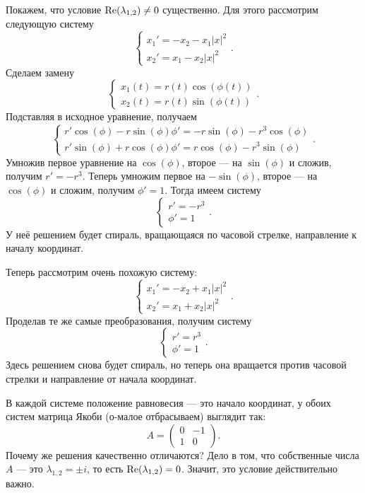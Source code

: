 Покажем, что условие $\operatorname{Re}(\lambda_{1, 2}) \ne 0$ существенно. Для этого рассмотрим следующую систему
\[
    \begin{cases}
        x_1' = -x_2 - x_1|x|^2 \\
        x_2' = x_1 - x_2|x|^2
    \end{cases}.
\]
Сделаем замену
\[
    \begin{cases}
        x_1(t) = r(t) \cos(\phi(t)) \\
        x_2(t) = r(t) \sin(\phi(t))
    \end{cases}.
\]
Подставляя в исходное уравнение, получаем
\[
    \begin{cases}
        r' \cos(\phi) - r \sin(\phi) \phi' = -r \sin(\phi) - r^3 \cos(\phi) \\
        r' \sin(\phi) + r \cos(\phi) \phi' = r \cos(\phi) - r^3 \sin(\phi)
    \end{cases}.
\]
Умножив первое уравнение на $\cos(\phi)$, второе --- на $\sin(\phi)$ и сложив, получим $r' = -r^3$.
Теперь умножим первое на $-\sin(\phi)$, второе --- на $\cos(\phi)$ и сложим, получим $\phi' = 1$.
Тогда имеем систему
\[
    \begin{cases}
        r' = -r^3\\
        \phi' = 1
    \end{cases}.
\]
У неё решением будет спираль, вращающаяся по часовой стрелке, направление к началу координат.

Теперь рассмотрим очень похожую систему:
\[
    \begin{cases}
        x_1' = -x_2 + x_1|x|^2 \\
        x_2' = x_1 + x_2|x|^2
    \end{cases}.
\]
Проделав те же самые преобразования, получим систему
\[
    \begin{cases}
        r' = r^3\\
        \phi' = 1
    \end{cases}.
\]
Здесь решением снова будет спираль, но теперь она вращается против часовой стрелки и направление от начала координат.

В каждой системе положение равновесия --- это начало координат, у обоих систем матрица Якоби (о-малое отбрасываем) выглядит так:
\[
    A =
    \begin{pmatrix}
        0 & -1 \\
        1 & 0
    \end{pmatrix}.
\]
Почему же решения качественно отличаются? Дело в том, что собственные числа $A$ --- это $\lambda_{1, 2} = \pm i$, то есть $\operatorname{Re}(\lambda_{1, 2}) = 0$. Значит, это условие действительно важно.

